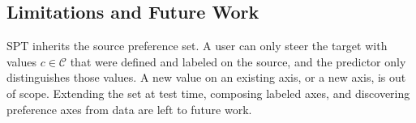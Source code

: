 \documentclass{article}
\begin{document}
\subsection{Limitations and Future Work}
\label{sec:limitations}

SPT inherits the source preference set. A user can only steer the target with
values $c\in\mathcal{C}$ that were defined and labeled on the source, and the
predictor only distinguishes those values. A new value on an existing axis, or a
new axis, is out of scope. Extending the set at test time, composing labeled
axes, and discovering preference axes from data are left to future work.














\clearpage



\end{document}
